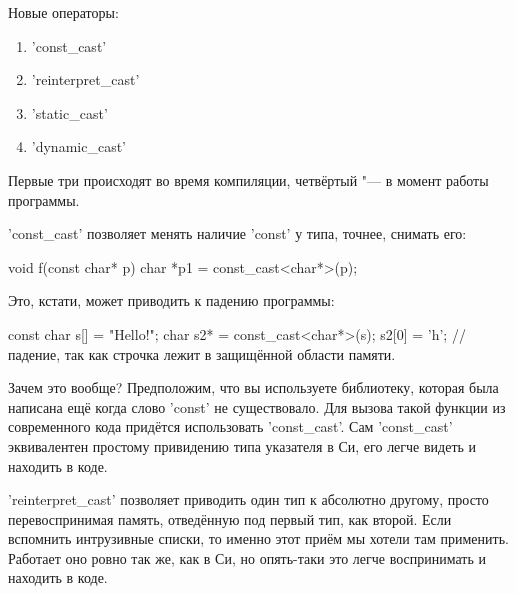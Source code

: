 Новые операторы:
 
\begin{enumerate}
        \item \cpp'const_cast'
        \item \cpp'reinterpret_cast'
        \item \cpp'static_cast'
        \item \cpp'dynamic_cast'
\end{enumerate}
 
Первые три происходят во время компиляции, четвёртый "--- в момент работы программы.
 
\cpp'const_cast' позволяет менять наличие \cpp'const' у типа, точнее, снимать его:
\begin{cppcode}
void f(const char* p)
{
         char *p1 = const_cast<char*>(p);
}
\end{cppcode}
 
Это, кстати, может приводить к падению программы:
\begin{cppcode}
const char s[] = "Hello!";
char s2* = const_cast<char*>(s);
s2[0] = 'h'; // падение, так как строчка лежит в защищённой области памяти.
\end{cppcode}
 
Зачем это вообще?
Предположим, что вы используете библиотеку, которая была написана ещё когда слово \cpp'const' не существовало.
Для вызова такой функции из современного кода придётся использовать \cpp'const_cast'.
Сам \cpp'const_cast' эквивалентен простому привидению типа указателя в Си, его легче видеть и находить в коде.
 
\cpp'reinterpret_cast' позволяет приводить один тип к абсолютно другому, просто перевоспринимая память, отведённую под первый тип, как второй.
Если вспомнить интрузивные списки, то именно этот приём мы хотели там применить. Работает оно ровно так же, как в Си, но опять-таки это легче воспринимать и находить в коде.
 
